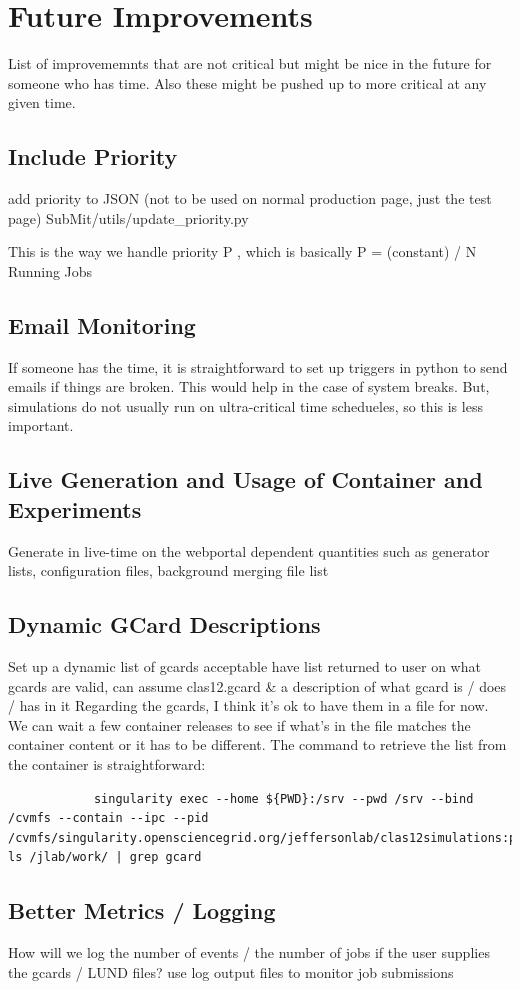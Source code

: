 \section{Future Improvements}
    List of improvememnts that are not critical but might be nice in the future for someone who has time. Also these might be pushed up to more critical at any given time.
    \subsection{Include Priority}
        add priority to JSON (not to be used on normal production page, just the test page)
       SubMit/utils/update\_priority.py
    
       This is the way we handle priority P , which is basically P =  (constant) / N Running Jobs
    
    \subsection{Email Monitoring}
        If someone has the time, it is straightforward to set up triggers in python to send emails if things are broken. This would help in the case of system breaks. But, simulations do not usually run on ultra-critical time schedueles, so this is less important.
    \subsection{Live Generation and Usage of Container and Experiments}
        Generate in live-time on the webportal dependent quantities such as generator lists, configuration files, background merging file list 
    \subsection{Dynamic GCard Descriptions}
        Set up a dynamic list of gcards acceptable have list returned to user on what gcards are valid, can assume clas12.gcard \& a description of what gcard is / does / has in it
        Regarding the gcards, I think it's ok to have them in a file for now. We can wait a few container releases to see if what's in the file matches the container content or it has to be different. 
        The command to retrieve the list from the container is straightforward:
        
        \begin{lstlisting}
            singularity exec --home ${PWD}:/srv --pwd /srv --bind /cvmfs --contain --ipc --pid /cvmfs/singularity.opensciencegrid.org/jeffersonlab/clas12simulations:production ls /jlab/work/ | grep gcard
        \end{lstlisting}
        
    \subsection{Better Metrics / Logging}
        How will we log the number of events / the number of jobs if the user supplies the gcards / LUND files?
        use log output files to monitor job submissions

